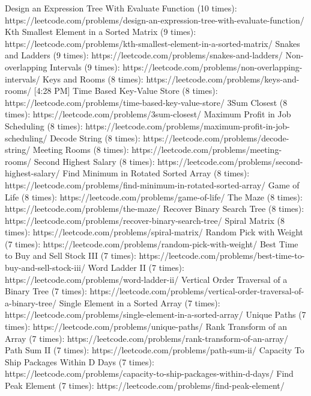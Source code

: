 Design an Expression Tree With Evaluate Function (10 times): https://leetcode.com/problems/design-an-expression-tree-with-evaluate-function/
Kth Smallest Element in a Sorted Matrix (9 times): https://leetcode.com/problems/kth-smallest-element-in-a-sorted-matrix/
Snakes and Ladders (9 times): https://leetcode.com/problems/snakes-and-ladders/
Non-overlapping Intervals (9 times): https://leetcode.com/problems/non-overlapping-intervals/
Keys and Rooms (8 times): https://leetcode.com/problems/keys-and-rooms/
[4:28 PM]
Time Based Key-Value Store (8 times): https://leetcode.com/problems/time-based-key-value-store/
3Sum Closest (8 times): https://leetcode.com/problems/3sum-closest/
Maximum Profit in Job Scheduling (8 times): https://leetcode.com/problems/maximum-profit-in-job-scheduling/
Decode String (8 times): https://leetcode.com/problems/decode-string/
Meeting Rooms (8 times): https://leetcode.com/problems/meeting-rooms/
Second Highest Salary (8 times): https://leetcode.com/problems/second-highest-salary/
Find Minimum in Rotated Sorted Array (8 times): https://leetcode.com/problems/find-minimum-in-rotated-sorted-array/
Game of Life (8 times): https://leetcode.com/problems/game-of-life/
The Maze (8 times): https://leetcode.com/problems/the-maze/
Recover Binary Search Tree (8 times): https://leetcode.com/problems/recover-binary-search-tree/
Spiral Matrix (8 times): https://leetcode.com/problems/spiral-matrix/
Random Pick with Weight (7 times): https://leetcode.com/problems/random-pick-with-weight/
Best Time to Buy and Sell Stock III (7 times): https://leetcode.com/problems/best-time-to-buy-and-sell-stock-iii/
Word Ladder II (7 times): https://leetcode.com/problems/word-ladder-ii/
Vertical Order Traversal of a Binary Tree (7 times): https://leetcode.com/problems/vertical-order-traversal-of-a-binary-tree/
Single Element in a Sorted Array (7 times): https://leetcode.com/problems/single-element-in-a-sorted-array/
Unique Paths (7 times): https://leetcode.com/problems/unique-paths/
Rank Transform of an Array (7 times): https://leetcode.com/problems/rank-transform-of-an-array/
Path Sum II (7 times): https://leetcode.com/problems/path-sum-ii/
Capacity To Ship Packages Within D Days (7 times): https://leetcode.com/problems/capacity-to-ship-packages-within-d-days/
Find Peak Element (7 times): https://leetcode.com/problems/find-peak-element/